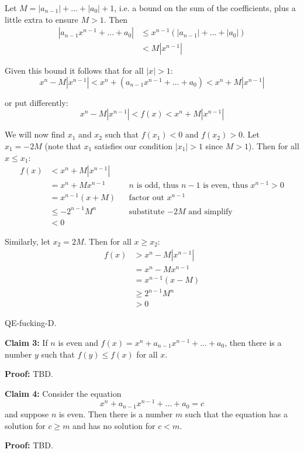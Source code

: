 Let $M=|a_{n-1}|+\ldots+|a_0|+1$, i.e. a bound on the sum of the
coefficients, plus a little extra to ensure $M>1$. Then
\begin{align*}
  |a_{n-1}x^{n-1}+\ldots+a_{0}| &\leq x^{n-1}(|a_{n-1}|+\ldots+|a_0|)\\
                           &< M|x^{n-1}|
\end{align*}

Given this bound it follows that for all $|x|>1$:
\[x^{n}-M|x^{n-1}|<x^{n}+(a_{n-1}x^{n-1}+\ldots+a_{0})<x^{n}+M|x^{n-1}|\]

or put differently:
\[x^{n}-M|x^{n-1}|<f(x)<x^{n}+M|x^{n-1}|\]

We will now find $x_1$ and $x_2$ such that $f(x_1)<0$ and $f(x_2)>0$.
Let $x_1=-2M$ (note that $x_1$ satisfies our condition $|x_1|>1$ since
$M>1$). Then for all $x\leq x_1$:
\begin{align*}
  f(x)&<x^{n}+M|x^{n-1}|\\
      &=x^n+Mx^{n-1}&&n \text{ is odd, thus } n-1\text{ is even, thus } x^{n-1}>0\\
      &=x^{n-1}(x+M)&&\text{factor out } x^{n-1}\\
      &\leq -2^{n-1}M^n&&\text{substitute $-2M$ and simplify}\\
      &<0
\end{align*}

Similarly, let $x_2=2M$. Then for all $x\geq x_2$:
\begin{align*}
  f(x)&>x^{n}-M|x^{n-1}|\\
      &=x^n-Mx^{n-1}\\
      &=x^{n-1}(x-M)\\
      &\geq 2^{n-1}M^n\\
      &>0
\end{align*}

QE-fucking-D.

\vs

\textbf{Claim 3:} If $n$ is even and
$f(x)=x^{n}+a_{n-1}x^{n-1}+\ldots+a_{0}$, then there is a number $y$ such
that $f(y)\leq f(x)$ for all $x$.

\vs

\textbf{Proof:} TBD.

\vs

\textbf{Claim 4:} Consider the equation
\[x^{n}+a_{n-1}x^{n-1}+\ldots+a_{0}=c\]
and suppose $n$ is even. Then there is a number $m$ such that the
equation has a solution for $c\geq m$ and has no solution for $c<m$.

\vs

\textbf{Proof:} TBD.

\vs




